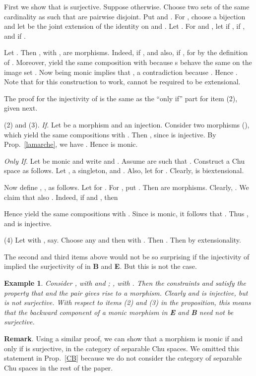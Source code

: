 \documentclass{LMCS}
\let\epf\endproof
\newtheorem{ex}[thm]{Example}
\begin{document}
First we show that  is surjective. Suppose otherwise. 
Choose two sets  of the same cardinality as  such that  are pairwise
disjoint.  Put  and . 
For , choose a bijection  and let  be the
joint extension of the identity  on  and .  Let .  For  and , let  if ,  if , and  if . 

Let . Then , with , are morphisms.  Indeed,  if , and  also, if , for
 by the definition of .  Moreover,  yield the
same composition with  because s behave the same on
the image set .  Now  being monic implies that
, a contradiction because . Hence .  Note that for this
construction to work,  cannot be required to be
extensional. 

The proof for the injectivity of  is the same as the ``only
if'' part for item (2), given next. 

(2) and (3).  \emph{If.} Let  be a morphism
and  an injection.  Consider two morphisms  (), which yield the same compositions
with .  Then , since 
is injective.  By Prop.~\ref{lamarche}, we have .  Hence  is monic. 

\emph{Only If.} Let    be monic and
write   and  . 
Assume    are such that  . 
Construct a Chu space  as follows. 
Let  , a singleton, and  . 
Also, let   for . Clearly,   is biextensional. 

Now define , , as follows. 
Let  for .  For , put
 .  Then
 are morphisms. 
Clearly, . 
We claim that also . Indeed, if  and , then


Hence  
yield the same compositions with  . 
Since    is monic, it follows that  . 
Thus  , and    is injective. 

(4) Let  with , say. Choose
any  and then  with . Then
. Then  by extensionality.  \epf

The second and third items above would not be so surprising
  if the injectivity of  implied the surjectivity of
   in {\bf B} and {\bf E}.  But this is not the case.

  \begin{ex} Consider , with
   and ; , with . Then the constraints  and  satisfy the property that  and
  the pair  gives rise to a morphism. Clearly  and  is injective, but  is not surjective.
  With respect to items (2) and (3) in the proposition, this means
  that the backward component of a monic morphism in {\bf E} and {\bf
  B} need not be surjective.
\end{ex}


{\bf Remark}. Using a similar proof,
we can show that a morphism  is monic  if and only if
 is surjective, in the category of separable Chu spaces. We omitted
this statement in Prop.~\ref{CB} because we do not consider the category of
separable Chu spaces in the rest of the paper.
\end{document}
